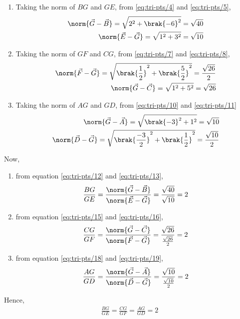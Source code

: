 \documentclass[journal,12pt,twocolumn]{IEEEtran}
\theoremstyle{remark}
\begin{document}
		
		
\begin{enumerate}
\item Taking the norm of $BG$ and $GE$, from \eqref{eq:tri-pts/4} and \eqref{eq:tri-pts/5}, 
\begin{align}
		\label{eq:tri-pts/12} \norm{\vec{G}-\vec{B}} = \sqrt{2^2 + \brak{-6}^{2}} = \sqrt{40} \\
		\label{eq:tri-pts/13} \norm{\vec{E}-\vec{G}} = \sqrt{1^2 + 3^2} = \sqrt{10} \\
\end{align}
\item Taking the norm of $GF$ and $CG$, from \eqref{eq:tri-pts/7} and \eqref{eq:tri-pts/8},	
\begin{align}
		\label{eq:tri-pts/15} \norm{\vec{F}-\vec{G}} = \sqrt{\brak{\frac{1}{2}}^{2} + \brak{\frac{5}{2}}^{2}} = \frac{\sqrt{26}}{2} \\  
		\label{eq:tri-pts/16} \norm{\vec{G}-\vec{C}} = \sqrt{1^2 + 5^2} = \sqrt{26} \\
\end{align}
\item Taking the norm of $AG$ and $GD$, from \eqref{eq:tri-pts/10} and \eqref{eq:tri-pts/11}	
\begin{align}
		\label{eq:tri-pts/18} \norm{\vec{G}-\vec{A}} = \sqrt{\brak{-3}^{2}+1^2} = \sqrt{10} \\
		\label{eq:tri-pts/19} \norm{\vec{D}-\vec{G}} = \sqrt{\brak{\frac{-3}{2}}^{2}+\brak{\frac{1}{2}}^{2}} = \frac{\sqrt{10}}{2}  
\end{align}
\end{enumerate}
Now,
\begin{enumerate}
\item from equation \eqref{eq:tri-pts/12} and \eqref{eq:tri-pts/13},   
\begin{align}
		\frac{BG}{GE} = \frac{\norm{\vec{G}-\vec{B}}}{\norm{\vec{E}-\vec{G}}} = \frac{\sqrt{40}}{\sqrt{10}} = 2 
\end{align}
\item from equation \eqref{eq:tri-pts/15} and \eqref{eq:tri-pts/16},
\begin{align} 
		\frac{CG}{GF} = \frac{\norm{\vec{G}-\vec{C}}}{\norm{\vec{F}-\vec{G}}} = \frac{\sqrt{26}}{\frac{\sqrt{26}}{2}} = 2 
\end{align}
\item from equation \eqref{eq:tri-pts/18} and \eqref{eq:tri-pts/19},
\begin{align}
		\frac{AG}{GD} = \frac{\norm{\vec{G}-\vec{A}}}{\norm{\vec{D}-\vec{G}}} = \frac{\sqrt{10}}{\frac{\sqrt{10}}{2}} = 2 
\end{align}
\end{enumerate}
Hence,
\begin{align}
		\frac{BG}{GE} = 
		\frac{CG}{GF} =
		\frac{AG}{GD} = 2
\end{align}
\end{document}

